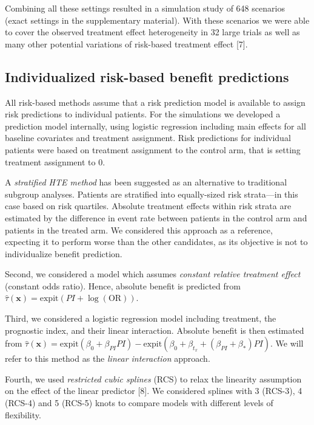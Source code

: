 \documentclass[]{elsarticle} %
\begin{document}
Combining all these settings resulted in a simulation study of 648
scenarios (exact settings in the supplementary material). With these
scenarios we were able to cover the observed treatment effect
heterogeneity in 32 large trials as well as many other potential
variations of risk-based treatment effect {[}7{]}.

\hypertarget{individualized-risk-based-benefit-predictions}{%
\subsection{Individualized risk-based benefit
predictions}\label{individualized-risk-based-benefit-predictions}}

All risk-based methods assume that a risk prediction model is available
to assign risk predictions to individual patients. For the simulations
we developed a prediction model internally, using logistic regression
including main effects for all baseline covariates and treatment
assignment. Risk predictions for individual patients were based on
treatment assignment to the control arm, that is setting treatment
assignment to 0.

A \emph{stratified HTE method} has been suggested as an alternative to
traditional subgroup analyses. Patients are stratified into
equally-sized risk strata---in this case based on risk quartiles.
Absolute treatment effects within risk strata are estimated by the
difference in event rate between patients in the control arm and
patients in the treated arm. We considered this approach as a reference,
expecting it to perform worse than the other candidates, as its
objective is not to individualize benefit prediction.

Second, we considered a model which assumes \emph{constant relative
treatment effect} (constant odds ratio). Hence, absolute benefit is
predicted from
\(\hat{\tau}(\bm{x}) = \text{expit}(PI +\log(\text{OR}))\).

Third, we considered a logistic regression model including treatment,
the prognostic index, and their linear interaction. Absolute benefit is
then estimated from
\(\hat{\tau}(\bm{x})=\text{expit}(\beta_0+\beta_{PI}PI) - \text{expit}(\beta_0+\beta_{t_x}+(\beta_{PI}+\beta_*)PI)\).
We will refer to this method as the \emph{linear interaction} approach.

Fourth, we used \emph{restricted cubic splines} (RCS) to relax the
linearity assumption on the effect of the linear predictor {[}8{]}. We
considered splines with 3 (RCS-3), 4 (RCS-4) and 5 (RCS-5) knots to
compare models with different levels of flexibility.
\end{document}
